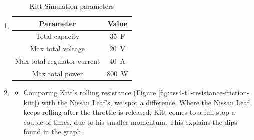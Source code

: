 \documentclass[11pt,titlepage]{report}
\begin{document}
\begin{enumerate}
\item
	\begin{table}[H]
		\centering
		\caption{Kitt Simulation parameters}
		\label{tab:ass4-sim-param-cap}
		\begin{tabular}{c c}
			\hline\hline
			Parameter & Value \\
			\hline
			Total capacity & \SI{35}{F} \cite{maxwell-dcell-datasheet} \\
			Max total voltage & \SI{20}{V} \\
			Max total regulator current & \SI{40}{A} \\
			Max total power & \SI{800}{W} \\
			\hline
			\end{tabular}
	\end{table}
\item
	\begin{itemize}
		\item
		Comparing Kitt's rolling resistance (Figure \ref{fig:ass4-t1-resistance-friction-kitt}) with the Nissan Leaf's, we spot a difference. Where the Nissan Leaf keeps rolling after the throttle is released, Kitt comes to a full stop a couple of times, due to his smaller momentum. This explains the dips found in the graph.


\end{itemize}
\end{enumerate}
\end{document}
